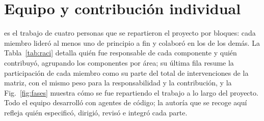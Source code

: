 \section{Equipo y contribución individual}\label{sec:equipo}

\kyrian{} es el trabajo de cuatro personas que se repartieron el proyecto por bloques: cada
miembro lideró al menos uno de principio a fin y colaboró en los de los demás. La
Tabla~\ref{tab:raci} detalla quién fue responsable de cada componente y quién contribuyó, agrupando
los componentes por área; su última fila resume la participación de cada miembro como su parte
del total de intervenciones de la matriz, con el mismo peso para la responsabilidad y la
contribución, y la Fig.~\ref{fig:fases} muestra cómo se fue repartiendo el trabajo a lo
largo del proyecto. Todo el equipo desarrolló con agentes de código; la autoría que se recoge aquí refleja quién especificó,
dirigió, revisó e integró cada parte.

